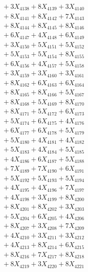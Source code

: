 \documentclass[a4paper,10pt]{article}
\begin{document}
{\begin{align}
&\;  + 3 X_{4138} + 8 X_{4139} + 3 X_{4140} \\[0.3ex]
&\;  + 8 X_{4141} + 8 X_{4142} + 7 X_{4143} \\[0.3ex]
&\;  + 8 X_{4144} + 8 X_{4145} + 8 X_{4146} \\[0.3ex]
&\;  + 6 X_{4147} + 4 X_{4148} + 6 X_{4149} \\[0.5ex]\allowbreak
&\;  + 3 X_{4150} + 5 X_{4151} + 5 X_{4152} \\[0.3ex]
&\;  + 5 X_{4153} + 5 X_{4154} + 8 X_{4155} \\[0.3ex]
&\;  + 6 X_{4156} + 4 X_{4157} + 5 X_{4158} \\[0.3ex]
&\;  + 3 X_{4159} + 3 X_{4160} + 3 X_{4161} \\[0.3ex]
&\;  + 8 X_{4162} + 6 X_{4163} + 6 X_{4164} \\[0.3ex]
&\;  + 8 X_{4165} + 8 X_{4166} + 5 X_{4167} \\[0.3ex]
&\;  + 8 X_{4168} + 5 X_{4169} + 8 X_{4170} \\[0.3ex]
&\;  + 8 X_{4171} + 5 X_{4172} + 6 X_{4173} \\[0.3ex]
&\;  + 5 X_{4174} + 6 X_{4175} + 4 X_{4176} \\[0.3ex]
&\;  + 6 X_{4177} + 6 X_{4178} + 5 X_{4179} \\[0.5ex]\allowbreak
&\;  + 5 X_{4180} + 4 X_{4181} + 4 X_{4182} \\[0.3ex]
&\;  + 5 X_{4183} + 4 X_{4184} + 5 X_{4185} \\[0.3ex]
&\;  + 4 X_{4186} + 6 X_{4187} + 5 X_{4188} \\[0.3ex]
&\;  + 7 X_{4189} + 7 X_{4190} + 6 X_{4191} \\[0.3ex]
&\;  + 5 X_{4192} + 5 X_{4193} + 5 X_{4194} \\[0.3ex]
&\;  + 4 X_{4195} + 4 X_{4196} + 7 X_{4197} \\[0.3ex]
&\;  + 4 X_{4198} + 3 X_{4199} + 8 X_{4200} \\[0.3ex]
&\;  + 8 X_{4201} + 8 X_{4202} + 3 X_{4203} \\[0.3ex]
&\;  + 5 X_{4204} + 6 X_{4205} + 4 X_{4206} \\[0.3ex]
&\;  + 8 X_{4207} + 3 X_{4208} + 7 X_{4209} \\[0.5ex]\allowbreak
&\;  + 4 X_{4210} + 3 X_{4211} + 3 X_{4212} \\[0.3ex]
&\;  + 4 X_{4213} + 8 X_{4214} + 6 X_{4215} \\[0.3ex]
&\;  + 8 X_{4216} + 7 X_{4217} + 8 X_{4218} \\[0.3ex]
&\;  + 8 X_{4219} + 3 X_{4220} + 8 X_{4221} \\[0.3ex]

\end{align}}
\end{document}
